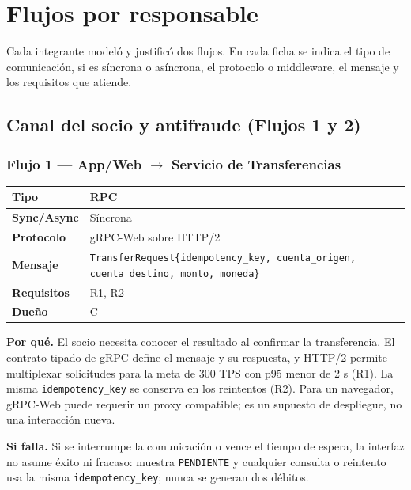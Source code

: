 \documentclass[11pt,a4paper]{article}
\begin{document}
\section{Flujos por responsable}
Cada integrante modeló y justificó dos flujos. En cada ficha se indica el tipo de comunicación,
si es síncrona o asíncrona, el protocolo o middleware, el mensaje y los requisitos que atiende.

\subsection{Canal del socio y antifraude (Flujos 1 y 2)}

\subsubsection*{Flujo 1 --- App/Web $\rightarrow$ Servicio de Transferencias}

\begin{tabular}{|l|p{9.5cm}|}
\hline
\textbf{Tipo} & RPC \\ \hline
\textbf{Sync/Async} & Síncrona \\ \hline
\textbf{Protocolo} & gRPC-Web sobre HTTP/2 \\ \hline
\textbf{Mensaje} & \texttt{TransferRequest\{idempotency\_key, cuenta\_origen, cuenta\_destino, monto, moneda\}} \\ \hline
\textbf{Requisitos} & R1, R2 \\ \hline
\textbf{Dueño} & C \\ \hline
\end{tabular}

\medskip
\textbf{Por qué.} El socio necesita conocer el resultado al confirmar la transferencia. El
contrato tipado de gRPC define el mensaje y su respuesta, y HTTP/2 permite multiplexar
solicitudes para la meta de 300 TPS con p95 menor de 2 s (R1). La misma
\texttt{idempotency\_key} se conserva en los reintentos (R2). Para un navegador, gRPC-Web puede
requerir un proxy compatible; es un supuesto de despliegue, no una interacción nueva.

\textbf{Si falla.} Si se interrumpe la comunicación o vence el tiempo de espera, la interfaz no
asume éxito ni fracaso: muestra \texttt{PENDIENTE} y cualquier consulta o reintento usa la misma
\texttt{idempotency\_key}; nunca se generan dos débitos.
\end{document}
